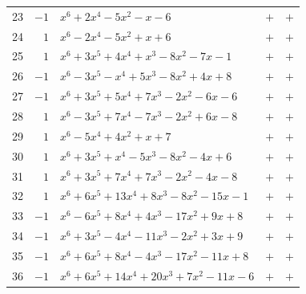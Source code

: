 \documentclass[11pt]{article}
\begin{document}
\begin{longtable}{@{}rrlcc@{}}
23 & $-1$ & $x^{6}+2x^{4}-5x^{2}-x-6$ & $+$ & $+$\\
24 & $1$ & $x^{6}-2x^{4}-5x^{2}+x+6$ & $+$ & $+$\\
25 & $1$ & $x^{6}+3x^{5}+4x^{4}+x^{3}-8x^{2}-7x-1$ & $+$ & $+$\\
26 & $-1$ & $x^{6}-3x^{5}-x^{4}+5x^{3}-8x^{2}+4x+8$ & $+$ & $+$\\
27 & $-1$ & $x^{6}+3x^{5}+5x^{4}+7x^{3}-2x^{2}-6x-6$ & $+$ & $+$\\
28 & $1$ & $x^{6}-3x^{5}+7x^{4}-7x^{3}-2x^{2}+6x-8$ & $+$ & $+$\\
29 & $1$ & $x^{6}-5x^{4}+4x^{2}+x+7$ & $+$ & $+$\\
30 & $1$ & $x^{6}+3x^{5}+x^{4}-5x^{3}-8x^{2}-4x+6$ & $+$ & $+$\\
31 & $1$ & $x^{6}+3x^{5}+7x^{4}+7x^{3}-2x^{2}-4x-8$ & $+$ & $+$\\
32 & $1$ & $x^{6}+6x^{5}+13x^{4}+8x^{3}-8x^{2}-15x-1$ & $+$ & $+$\\
33 & $-1$ & $x^{6}-6x^{5}+8x^{4}+4x^{3}-17x^{2}+9x+8$ & $+$ & $+$\\
34 & $-1$ & $x^{6}+3x^{5}-4x^{4}-11x^{3}-2x^{2}+3x+9$ & $+$ & $+$\\
35 & $-1$ & $x^{6}+6x^{5}+8x^{4}-4x^{3}-17x^{2}-11x+8$ & $+$ & $+$\\
36 & $-1$ & $x^{6}+6x^{5}+14x^{4}+20x^{3}+7x^{2}-11x-6$ & $+$ & $+$\\
\end{longtable}
\endgroup
\end{document}
